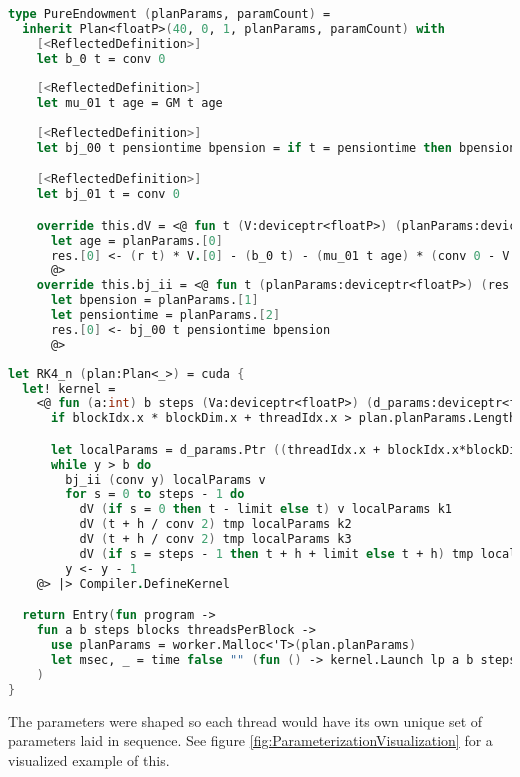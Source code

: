 \begin{lstlisting}[language=FSharp, caption=Parameterized pure endowment life insurance plan in F\# Alea.cuBase, label=cubase_pureendowmentparams]
type PureEndowment (planParams, paramCount) =
  inherit Plan<floatP>(40, 0, 1, planParams, paramCount) with
    [<ReflectedDefinition>]
    let b_0 t = conv 0
    
    [<ReflectedDefinition>]
    let mu_01 t age = GM t age
    
    [<ReflectedDefinition>]
    let bj_00 t pensiontime bpension = if t = pensiontime then bpension else conv 0

    [<ReflectedDefinition>]
    let bj_01 t = conv 0

    override this.dV = <@ fun t (V:deviceptr<floatP>) (planParams:deviceptr<floatP>) (res:deviceptr<floatP>) -> 
      let age = planParams.[0]
      res.[0] <- (r t) * V.[0] - (b_0 t) - (mu_01 t age) * (conv 0 - V.[0] + (bj_01 t))
      @>
    override this.bj_ii = <@ fun t (planParams:deviceptr<floatP>) (res:deviceptr<floatP>) -> 
      let bpension = planParams.[1]                
      let pensiontime = planParams.[2]
      res.[0] <- bj_00 t pensiontime bpension
      @>
\end{lstlisting}

\begin{lstlisting}[language=FSharp, caption=Parameterized RK4\_n kernel changes in F\# Alea.cuBase, label=cubase_rk4nparams]
let RK4_n (plan:Plan<_>) = cuda {
  let! kernel =
    <@ fun (a:int) b steps (Va:deviceptr<floatP>) (d_params:deviceptr<floatP>) (result:deviceptr<floatP>) ->
      if blockIdx.x * blockDim.x + threadIdx.x > plan.planParams.Length/plan.paramCount then () else

      let localParams = d_params.Ptr ((threadIdx.x + blockIdx.x*blockDim.x)*plan.paramCount)
      while y > b do
        bj_ii (conv y) localParams v
        for s = 0 to steps - 1 do
          dV (if s = 0 then t - limit else t) v localParams k1
          dV (t + h / conv 2) tmp localParams k2
          dV (t + h / conv 2) tmp localParams k3
          dV (if s = steps - 1 then t + h + limit else t + h) tmp localParams k4
        y <- y - 1
    @> |> Compiler.DefineKernel 

  return Entry(fun program ->
    fun a b steps blocks threadsPerBlock ->
      use planParams = worker.Malloc<'T>(plan.planParams)
      let msec, _ = time false "" (fun () -> kernel.Launch lp a b steps Va.Ptr planParams.Ptr result.Ptr)
    )
}
\end{lstlisting}
The parameters were shaped so each thread would have its own unique set of parameters laid in sequence. 
See figure \ref{fig:ParameterizationVisualization} for a visualized example of this.

